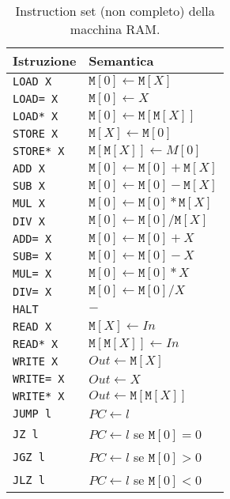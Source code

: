 \documentclass[a4paper,11pt,oneside]{article}
\theoremstyle{plain}
\theoremstyle{definition}
\theoremstyle{remark}
\begin{document}
\begin{table}[htb]
  \centering
  \begin{tabular}{ll}
    \toprule
    Istruzione & Semantica \\
    \midrule
    \texttt{LOAD X}   & $\mathtt{M}[0] \gets \mathtt{M}[X]$ \\
    \texttt{LOAD= X}  & $\mathtt{M}[0] \gets X$ \\
    \texttt{LOAD* X}  & $\mathtt{M}[0] \gets \mathtt{M}[\mathtt{M}[X]]$ \\
    \texttt{STORE X}  & $\mathtt{M}[X] \gets \mathtt{M}[0]$ \\
    \texttt{STORE* X} & $\mathtt{M}[\mathtt{M}[X]] \gets M[0]$ \\
    \texttt{ADD X}    & $\mathtt{M}[0] \gets \mathtt{M}[0] + \mathtt{M}[X]$ \\
    \texttt{SUB X}    & $\mathtt{M}[0] \gets \mathtt{M}[0] - \mathtt{M}[X]$ \\
    \texttt{MUL X}    & $\mathtt{M}[0] \gets \mathtt{M}[0] * \mathtt{M}[X]$ \\
    \texttt{DIV X}    & $\mathtt{M}[0] \gets \mathtt{M}[0] / \mathtt{M}[X]$ \\
    \texttt{ADD= X}   & $\mathtt{M}[0] \gets \mathtt{M}[0] + X$ \\
    \texttt{SUB= X}   & $\mathtt{M}[0] \gets \mathtt{M}[0] - X$ \\
    \texttt{MUL= X}   & $\mathtt{M}[0] \gets \mathtt{M}[0] * X$ \\
    \texttt{DIV= X}   & $\mathtt{M}[0] \gets \mathtt{M}[0] / X$ \\
    \texttt{HALT}     & $-$ \\
    \texttt{READ X}   & $\mathtt{M}[X] \gets In$ \\
    \texttt{READ* X}  & $\mathtt{M}[\mathtt{M}[X]] \gets In$ \\
    \texttt{WRITE X}  & $Out \gets \mathtt{M}[X]$ \\
    \texttt{WRITE= X} & $Out \gets X$ \\
    \texttt{WRITE* X} & $Out \gets \mathtt{M}[\mathtt{M}[X]]$ \\
    \texttt{JUMP l}   & $PC \gets l$ \\
    \texttt{JZ l}     & $PC \gets l$ se $\mathtt{M}[0] = 0$ \\
    \texttt{JGZ l}    & $PC \gets l$ se $\mathtt{M}[0] > 0$ \\
    \texttt{JLZ l}    & $PC \gets l$ se $\mathtt{M}[0] < 0$ \\
    \bottomrule
  \end{tabular}
  \caption{Instruction set (non completo) della macchina RAM\@.}%
  \label{tab:ram-isa}
\end{table}
\end{document}
